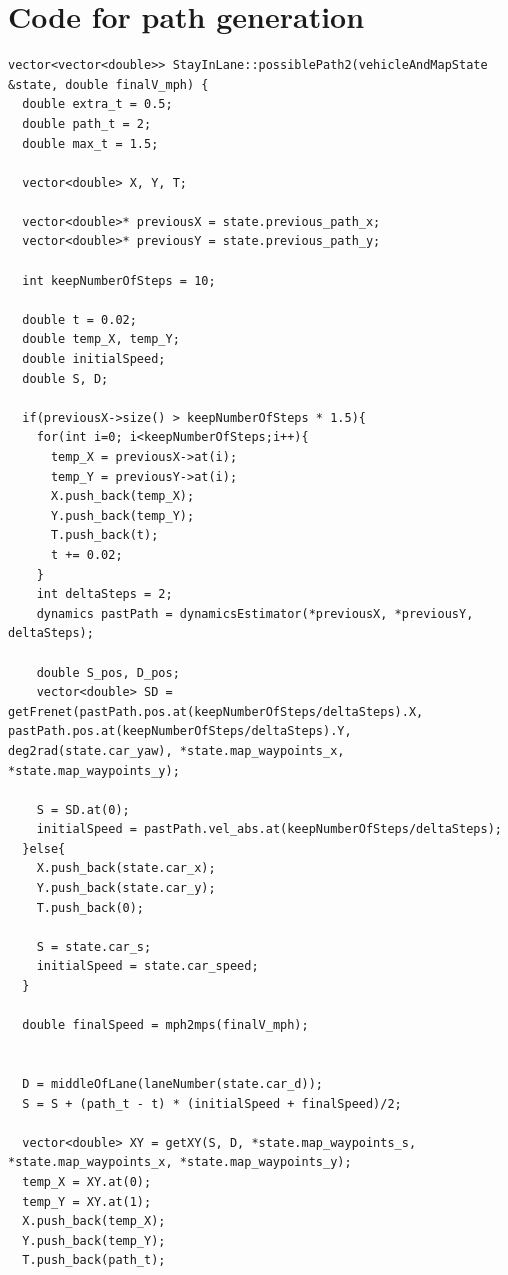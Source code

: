 \documentclass[12pt,a4paper]{article}
\begin{document}
\section{Code for path generation}
\begin{lstlisting}[title=Lane following state path generation]
vector<vector<double>> StayInLane::possiblePath2(vehicleAndMapState &state, double finalV_mph) {
  double extra_t = 0.5;
  double path_t = 2;
  double max_t = 1.5;

  vector<double> X, Y, T;

  vector<double>* previousX = state.previous_path_x;
  vector<double>* previousY = state.previous_path_y;

  int keepNumberOfSteps = 10;

  double t = 0.02;
  double temp_X, temp_Y;
  double initialSpeed;
  double S, D;

  if(previousX->size() > keepNumberOfSteps * 1.5){
    for(int i=0; i<keepNumberOfSteps;i++){
      temp_X = previousX->at(i);
      temp_Y = previousY->at(i);
      X.push_back(temp_X);
      Y.push_back(temp_Y);
      T.push_back(t);
      t += 0.02;
    }
    int deltaSteps = 2;
    dynamics pastPath = dynamicsEstimator(*previousX, *previousY, deltaSteps);

    double S_pos, D_pos;
    vector<double> SD = getFrenet(pastPath.pos.at(keepNumberOfSteps/deltaSteps).X, pastPath.pos.at(keepNumberOfSteps/deltaSteps).Y, deg2rad(state.car_yaw), *state.map_waypoints_x, *state.map_waypoints_y);

    S = SD.at(0);
    initialSpeed = pastPath.vel_abs.at(keepNumberOfSteps/deltaSteps);
  }else{
    X.push_back(state.car_x);
    Y.push_back(state.car_y);
    T.push_back(0);

    S = state.car_s;
    initialSpeed = state.car_speed;
  }

  double finalSpeed = mph2mps(finalV_mph);


  D = middleOfLane(laneNumber(state.car_d));
  S = S + (path_t - t) * (initialSpeed + finalSpeed)/2;

  vector<double> XY = getXY(S, D, *state.map_waypoints_s, *state.map_waypoints_x, *state.map_waypoints_y);
  temp_X = XY.at(0);
  temp_Y = XY.at(1);
  X.push_back(temp_X);
  Y.push_back(temp_Y);
  T.push_back(path_t);


\end{lstlisting}
\end{document}

